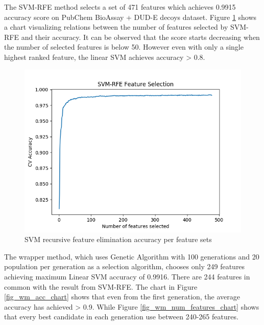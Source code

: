 \documentclass[conference]{IEEEtran}
\begin{document}
The SVM-RFE method selects a set of 471 features which achieves 0.9915 accuracy score on PubChem BioAssay + DUD-E decoys dataset. Figure \ref{fig_svmrfe_acc_num_features_chart} shows a chart visualizing relations between the number of features selected by SVM-RFE and their accuracy. It can be observed that the score starts decreasing when the number of selected features is below 50. However even with only a single highest ranked feature, the linear SVM achieves accuracy > 0.8.

\begin{figure}
	\includegraphics[scale=0.5]{../images/SVM_RFE_chart.png}
	\caption{SVM recursive feature elimination accuracy per feature sets}
	\label{fig_svmrfe_acc_num_features_chart}
\end{figure}

The wrapper method, which uses Genetic Algorithm with 100 generations and 20 population per generation as a selection algorithm, chooses only 249 features achieving maximum Linear SVM accuracy of 0.9916. There are 244 features in common with the result from SVM-RFE. The chart in Figure \ref{fig_wm_acc_chart} shows that even from the first generation, the average accuracy has achieved > 0.9. While Figure \ref{fig_wm_num_features_chart} shows that every best candidate in each generation use between 240-265 features.
\end{document}
